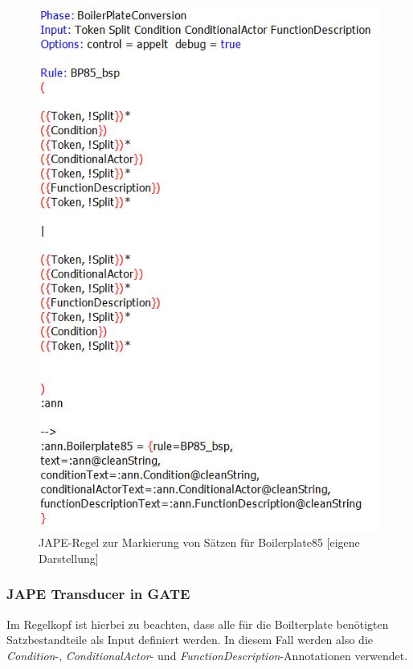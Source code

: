 \documentclass[12pt]{report}
\begin{document}
\begin{figure}[h!]
\begin{center}
\includegraphics[scale=0.8]{Bilder/Boilerplate85Jape.jpg}
\caption{JAPE-Regel zur Markierung von Sätzen für Boilerplate85 [eigene Darstellung]}
\end{center}
\end{figure}

\subsubsection{JAPE Transducer in GATE}
Im Regelkopf ist hierbei zu beachten, dass alle für die Boilterplate benötigten Satzbestandteile als Input definiert werden. In diesem Fall werden also die \textit{Condition}-, \textit{ConditionalActor}- und \textit{FunctionDescription}-Annotationen verwendet. 
\end{document}
